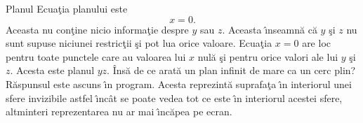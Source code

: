 \begin{surferPage}[Planul]{Planul}
Ecua\c tia planului este  \[x=0.\] Aceasta nu con\c tine nicio informa\c tie despre $y$ sau $z$. Aceasta \^\i nseamn\u a c\u a   $y$ \c si $z$ nu sunt supuse niciunei restric\c tii \c si pot lua orice valoare. Ecua\c tia $x=0$ are loc pentru toate punctele care au valoarea lui  $x$ nul\u a \c si pentru orice valori ale lui $y$ \c si $z$. Acesta este planul  $yz$.
\newline \newline
\^Ins\u a de ce arat\u a un plan infinit de mare ca un cerc plin? R\u aspunsul este ascuns \^\i n program. Acesta reprezint\u a suprafa\c ta \^\i n interiorul unei sfere invizibile astfel \^\i nc\^at se poate vedea tot ce este \^\i n interiorul acestei sfere, altminteri reprezentarea nu ar mai \^\i nc\u apea pe ecran.
\end{surferPage}

